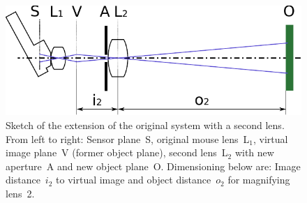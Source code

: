 \documentclass[12pt,a4paper]{article}
\begin{document}
\begin{figure}[htbp]
\begin{center}
\includegraphics[width=1\columnwidth]{figures/sketch-optic-2lens}
\caption{\label{fig:sk2l}
Sketch of the extension of the original system with a second lens.
From left to right: 
Sensor plane~S,
original mouse lens~L$_1$, 
virtual image plane~V (former object plane),
second lens~L$_2$ with new aperture~A and
new object plane~O.
Dimensioning below are: 
Image distance~$i_2$ to virtual image and object distance~$o_2$ for magnifying lens~2. %
}
\end{center}
\end{figure}
\end{document}
